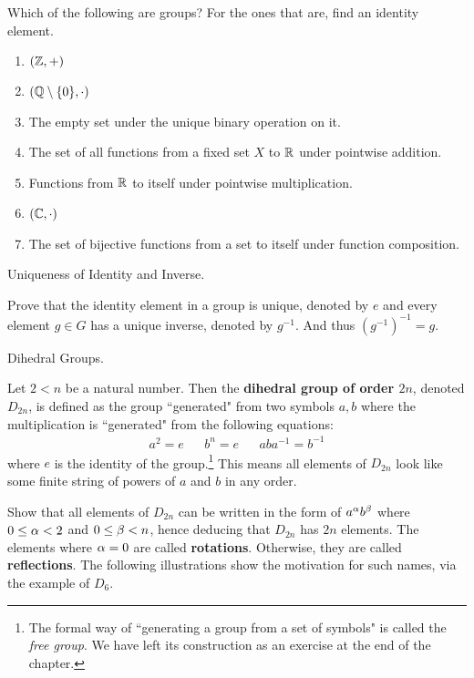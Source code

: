 \documentclass[../../book.tex]{subfiles}
\begin{document}
\begin{ex}
    
    Which of the following are groups? 
    For the ones that are, find an identity element. 
    \begin{enumerate}
        \item $(\mathbb{Z},+)$
        \item $(\mathbb{Q}\setminus\{0\},\cdot)$
        \item The empty set under the unique binary operation on it. 
        \item The set of all functions from a fixed set $X$
        to $\mathbb{R}$ under pointwise addition.
        \item Functions from $\mathbb{R}$ to itself under pointwise multiplication. 
        \item $(\mathbb{C},\cdot)$
        \item The set of bijective functions from a set to itself 
        under function composition.
    \end{enumerate}
    
\end{ex}
\begin{ex} Uniqueness of Identity and Inverse.

    Prove that the identity element in a group is unique, denoted by $e$ and every element $g \in G$ has a unique inverse, denoted by $g^{-1}$. And thus $(g^{-1})^{-1}=g$.
\end{ex}
\begin{ex} Dihedral Groups.
    
    Let $2 < n$ be a natural number. 
    Then the \textbf{dihedral group of order $2n$}, denoted $D_{2n}$,
    is defined as the group ``generated" from two symbols $a, b$
    where the multiplication is ``generated" from the following equations: 
    \begin{align*}
        a^2 = e && b^n = e && a b a^{-1} = b^{-1}
    \end{align*}
    where $e$ is the identity of the group.\footnote{
        The formal way of ``generating a group from a set of symbols" is called 
        the \emph{free group}. 
        We have left its construction as an exercise
        at the end of the chapter. 
    }
    This means all elements of $D_{2n}$ look like 
    some finite string of powers of $a$ and $b$ in any order.
    
    Show that all elements of $D_{2n}$ can be written in the form of
    $a^\alpha b^\beta$ where $0 \leq \alpha < 2$ and $0 \leq \beta < n$,
    hence deducing that $D_{2n}$ has $2n$ elements. 
    The elements where $\alpha = 0$ are called \textbf{rotations}.
    Otherwise, they are called \textbf{reflections}. 
    The following illustrations show the motivation for such names,
    via the example of $D_6$.
    
    
\end{ex}
\end{document}
